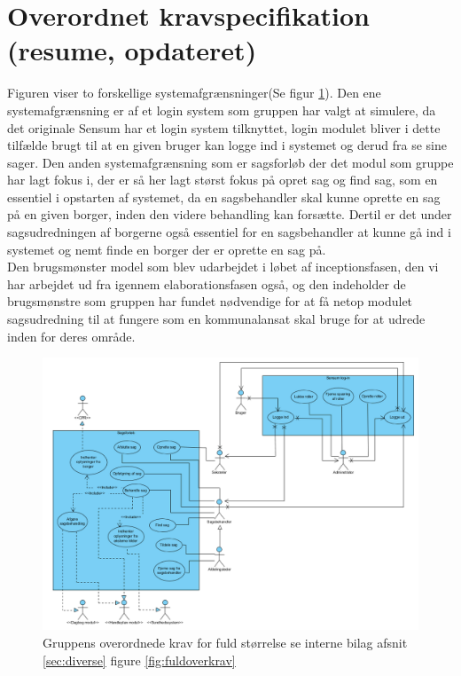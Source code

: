 \section{Overordnet kravspecifikation (resume, opdateret)}
Figuren viser to forskellige systemafgrænsninger(Se figur \ref{fig:overkrav}). Den ene systemafgrænsning er af et login system som gruppen har valgt at simulere, da det originale Sensum har et login system tilknyttet, login modulet bliver i dette tilfælde brugt til at en given bruger kan logge ind i systemet og derud fra se sine sager. Den anden systemafgrænsning som er sagsforløb der det modul som gruppe har lagt fokus i, der er så her lagt størst fokus på opret sag og find sag, som en essentiel i opstarten af systemet, da en sagsbehandler skal kunne oprette en sag på en given borger, inden den videre behandling kan forsætte. Dertil er det under sagsudredningen af borgerne også essentiel for en sagsbehandler at kunne gå ind i systemet og nemt finde en borger der er oprette en sag på.\\
Den brugsmønster model som blev udarbejdet i løbet af inceptionsfasen, den vi har arbejdet ud fra igennem elaborationsfasen også, og den indeholder de brugsmønstre som gruppen har fundet nødvendige for at få netop modulet sagsudredning til at fungere som en kommunalansat skal bruge for at udrede inden for deres område. 
\begin{figure}[h]
  \includegraphics[scale = 0.4]{./PNG/krav/overkrav.PNG} 
  \caption{Gruppens overordnede krav for fuld størrelse se interne bilag afsnit \ref{sec:diverse} figure \ref{fig:fuldoverkrav}}
  \label{fig:overkrav}
\end{figure}

